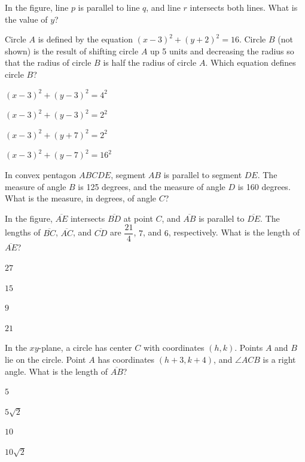 \vfill
\noindent\begin{minipage}{\linewidth}
\par\smallskip
In the figure, line $p$ is parallel to line $q$, and line $r$ intersects both lines. What is the value of $y$?
\satfig{\figparallelpqr}
\end{minipage}
\vfill
\clearpage
\noindent\begin{minipage}{\linewidth}
\par\smallskip
Circle $A$ is defined by the equation $(x-3)^2+(y+2)^2=16$. Circle $B$ (not shown) is the result of shifting circle $A$ up 5 units and decreasing the radius so that the radius of circle $B$ is half the radius of circle $A$. Which equation defines circle $B$?
\begin{satchoices}
  \item[A)] $(x-3)^2+(y-3)^2=4^2$
  \item[B)] $(x-3)^2+(y-3)^2=2^2$
  \item[C)] $(x-3)^2+(y+7)^2=2^2$
  \item[D)] $(x-3)^2+(y-7)^2=16^2$
\end{satchoices}
\end{minipage}
\vfill
\noindent\begin{minipage}{\linewidth}
\par\smallskip
In convex pentagon $ABCDE$, segment $AB$ is parallel to segment $DE$. The measure of angle $B$ is 125 degrees, and the measure of angle $D$ is 160 degrees. What is the measure, in degrees, of angle $C$?
\end{minipage}
\vfill
\noindent\begin{minipage}{\linewidth}
\par\smallskip
In the figure, $\overline{AE}$ intersects $\overline{BD}$ at point $C$, and $\overline{AB}$ is parallel to $\overline{DE}$. The lengths of $\overline{BC}$, $\overline{AC}$, and $\overline{CD}$ are $\dfrac{21}{4}$, $7$, and $6$, respectively. What is the length of $\overline{AE}$?
\satfig{\figbowtie}
\begin{satchoices}
  \item[A)] $27$
  \item[B)] $15$
  \item[C)] $9$
  \item[D)] $21$
\end{satchoices}
\end{minipage}
\vfill
\clearpage
\noindent\begin{minipage}{\linewidth}
\par\smallskip
In the $xy$-plane, a circle has center $C$ with coordinates $(h,k)$. Points $A$ and $B$ lie on the circle. Point $A$ has coordinates $(h+3,k+4)$, and $\angle ACB$ is a right angle. What is the length of $\overline{AB}$?
\begin{satchoices}
  \item[A)] $5$
  \item[B)] $5\sqrt{2}$
  \item[C)] $10$
  \item[D)] $10\sqrt{2}$
\end{satchoices}
\end{minipage}
